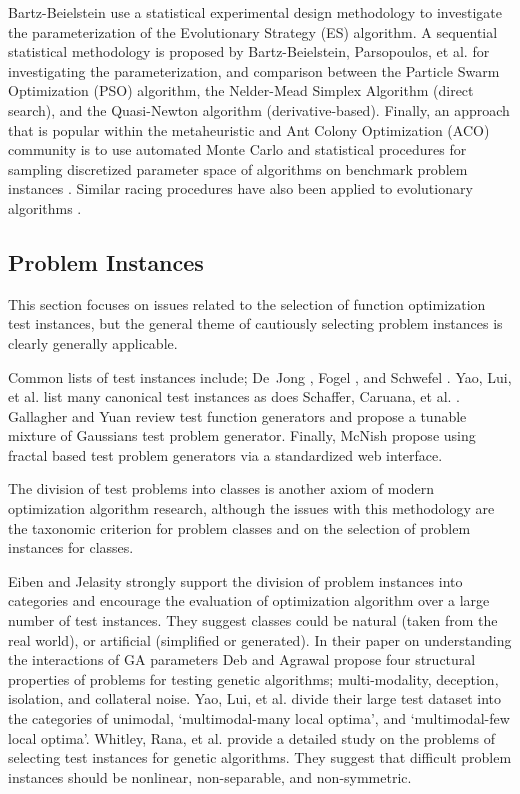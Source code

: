 Bartz-Beielstein \cite{Bartz-Beielstein2003} use a statistical experimental design methodology to investigate the parameterization of the Evolutionary Strategy (ES) algorithm. A sequential statistical methodology is proposed by Bartz-Beielstein, Parsopoulos, et al. \cite{Bartz-Beielstein2004} for investigating the parameterization, and comparison between the Particle Swarm Optimization (PSO) algorithm, the Nelder-Mead Simplex Algorithm (direct search), and the Quasi-Newton algorithm (derivative-based). Finally, an approach that is popular within the metaheuristic and Ant Colony Optimization (ACO) community is to use automated Monte Carlo and statistical procedures for sampling discretized parameter space of algorithms on benchmark problem instances \cite{Birattari2002}. Similar racing procedures have also been applied to evolutionary algorithms \cite{Yuan2004}.

% 
% 
\subsection{Problem Instances}
This section focuses on issues related to the selection of function optimization test instances, but the general theme of cautiously selecting problem instances is clearly generally applicable.

Common lists of test instances include; De~Jong \cite{Jong1975}, Fogel \cite{Fogel1995}, and Schwefel \cite{Schwefel1995}. Yao, Lui, et al. \cite{Yao1999} list many canonical test instances as does Schaffer, Caruana, et al. \cite{Schaffer1989}. Gallagher and Yuan \cite{Gallagher2006} review test function generators and propose a tunable mixture of Gaussians test problem generator. Finally, McNish \cite{MacNish2005} propose using fractal based test problem generators via a standardized web interface.

The division of test problems into classes is another axiom of modern optimization algorithm research, although the issues with this methodology are the taxonomic criterion for problem classes and on the selection of problem instances for classes.

Eiben and Jelasity \cite{Eiben2002} strongly support the division of problem instances into categories and encourage the evaluation of optimization algorithm over a large number of test instances. They suggest classes could be natural (taken from the real world), or artificial (simplified or generated). In their paper on understanding the interactions of GA parameters Deb and Agrawal \cite{Deb1999} propose four structural properties of problems for testing genetic algorithms; multi-modality, deception, isolation, and collateral noise. Yao, Lui, et al. \cite{Yao1999} divide their large test dataset into the categories of unimodal,	`multimodal-many	local	optima',	and `multimodal-few local optima'. Whitley, Rana, et al. \cite{Whitley1996} provide a detailed study on the problems of selecting test instances for genetic algorithms. They suggest that difficult problem instances should be nonlinear, non-separable, and non-symmetric.

